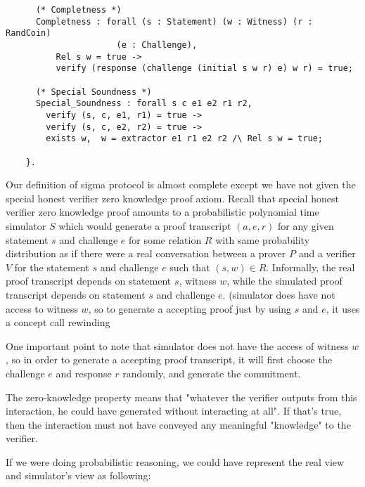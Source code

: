 \begin{Definition}
\begin{verbatim}
      (* Completness *)
      Completness : forall (s : Statement) (w : Witness) (r : RandCoin)
                      (e : Challenge),
          Rel s w = true ->
          verify (response (challenge (initial s w r) e) w r) = true;
                                       
      (* Special Soundness *)
      Special_Soundness : forall s c e1 e2 r1 r2, 
        verify (s, c, e1, r1) = true ->
        verify (s, c, e2, r2) = true ->
        exists w,  w = extractor e1 r1 e2 r2 /\ Rel s w = true;
      
    }.

\end{verbatim}

\noindent
Our definition of sigma protocol is almost complete except we have not given 
the special honest verifier zero knowledge proof axiom.  Recall that special honest 
verifier zero knowledge proof amounts to a probabilistic polynomial time simulator 
$S$ which would generate a proof transcript $(a, e, r)$ for any given statement 
$s$ and challenge $e$ for some relation $R$ with same probability distribution as if there 
were a real conversation between a prover $P$ and a verifier $V$ 
for the statement $s$ and challenge $e$ such that $(s, w) \in  R$.
Informally, the real proof transcript depends on statement $s$, witness $w$, 
while the simulated proof transcript depends on statement $s$ and challenge $e$. 
(simulator does have not access to witness $w$, so to generate a accepting 
proof just by using $s$ and $e$, it uses a concept call rewinding  


One important point to note that simulator does not have the access of 
witness $w$, so in order to generate a accepting proof transcript, 
it will first choose the challenge $e$ and response $r$ randomly, and generate 
the commitment. 

The zero-knowledge property means that "whatever the verifier outputs from this interaction, he could have generated without interacting at all". If that's true, then the interaction must not have conveyed any meaningful "knowledge" to the verifier.



If we were doing probabilistic reasoning, we could have represent the real view and 
simulator's view as following:
\begin{verbatim}


\end{verbatim}





\end{Definition}
